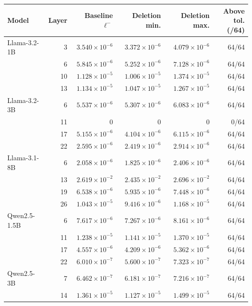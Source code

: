 \begin{tabular}{@{}lrrrrr@{}}
\toprule
Model & Layer & Baseline $\ell^-$ & Deletion min. & Deletion max. & \shortstack{Above tol.\\(/64)} \\
\midrule
Llama-3.2-1B & 3 & $3.540\times10^{-6}$ & $3.372\times10^{-6}$ & $4.079\times10^{-6}$ & 64/64 \\
 & 6 & $5.845\times10^{-6}$ & $5.252\times10^{-6}$ & $7.128\times10^{-6}$ & 64/64 \\
 & 10 & $1.128\times10^{-5}$ & $1.006\times10^{-5}$ & $1.374\times10^{-5}$ & 64/64 \\
 & 13 & $1.134\times10^{-5}$ & $1.047\times10^{-5}$ & $1.267\times10^{-5}$ & 64/64 \\
\addlinespace[2pt]
Llama-3.2-3B & 6 & $5.537\times10^{-6}$ & $5.307\times10^{-6}$ & $6.083\times10^{-6}$ & 64/64 \\
 & 11 & $0$ & $0$ & $0$ & 0/64 \\
 & 17 & $5.155\times10^{-6}$ & $4.104\times10^{-6}$ & $6.115\times10^{-6}$ & 64/64 \\
 & 22 & $2.595\times10^{-6}$ & $2.419\times10^{-6}$ & $2.914\times10^{-6}$ & 64/64 \\
\addlinespace[2pt]
Llama-3.1-8B & 6 & $2.058\times10^{-6}$ & $1.825\times10^{-6}$ & $2.406\times10^{-6}$ & 64/64 \\
 & 13 & $2.619\times10^{-2}$ & $2.435\times10^{-2}$ & $2.696\times10^{-2}$ & 64/64 \\
 & 19 & $6.538\times10^{-6}$ & $5.935\times10^{-6}$ & $7.448\times10^{-6}$ & 64/64 \\
 & 26 & $1.043\times10^{-5}$ & $9.416\times10^{-6}$ & $1.168\times10^{-5}$ & 64/64 \\
\addlinespace[2pt]
Qwen2.5-1.5B & 6 & $7.617\times10^{-6}$ & $7.267\times10^{-6}$ & $8.161\times10^{-6}$ & 64/64 \\
 & 11 & $1.238\times10^{-5}$ & $1.141\times10^{-5}$ & $1.370\times10^{-5}$ & 64/64 \\
 & 17 & $4.557\times10^{-6}$ & $4.209\times10^{-6}$ & $5.362\times10^{-6}$ & 64/64 \\
 & 22 & $6.010\times10^{-7}$ & $5.600\times10^{-7}$ & $7.323\times10^{-7}$ & 64/64 \\
\addlinespace[2pt]
Qwen2.5-3B & 7 & $6.462\times10^{-7}$ & $6.181\times10^{-7}$ & $7.216\times10^{-7}$ & 64/64 \\
 & 14 & $1.361\times10^{-5}$ & $1.127\times10^{-5}$ & $1.499\times10^{-5}$ & 64/64 \\

\end{tabular}
